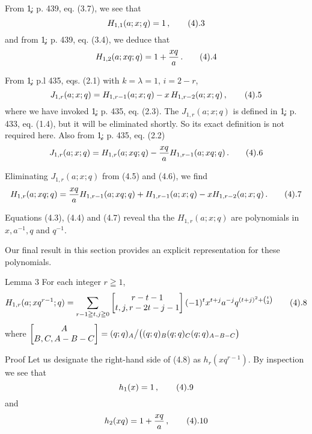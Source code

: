 From \c{1; p. 439, eq. (3.7)}, we see that
$$
	H_{1,1} (a; x; q) = 1\,,
\tag4.3
$$
and from \c{1; p. 439, eq. (3.4)}, we deduce that 
$$
	H_{1,2} (a; xq; q) = 1 + \fr{xq}{a}\,.
\tag4.4
$$

From \c{1; p.l 435, eqs. (2.1) with $k = \lambda = 1$, $i = 
2-r$},
$$
	J_{1,r} (a;x;q) = H_{1,r-1}(a;x;q) - x\,H_{1,r-2}
	(a;x;q)\,,
\tag4.5
$$
where we have invoked \c{1; p. 435, eq. (2.3)}.  The $J_{1,r}
(a;x;q)$ is defined in \c{1; p. 433, eq. (1.4)}, but it will be
eliminated shortly.  So its exact definition is not required here.
Also from \c{1; p. 435, eq. (2.2)}
$$
	J_{1,r}(a;x;q) = H_{1,r} (a;xq;q) - \fr{xq}{a}
	H_{1,r-1} (a;xq;q)\,.
\tag4.6
$$

Eliminating $J_{1,r}(a;x;q)$ from (4.5) and (4.6), we find
$$
	H_{1,r}(a;xq;q) = \fr{xq}{a} H_{1,r-1}(a;xq;q) + 
	H_{1,r-1}(a;x;q) - x H_{1,r-2} (a;x;q)\,.
\tag4.7
$$

Equations (4.3), (4.4) and (4.7) reveal tha the $H_{1,r}(a;x;q)$
are polynomials in $x,a^{-1},q$ and $q^{-1}$.

Our final result in this section provides an explicit representation
for these polynomials.

\proclaim
{Lemma 3}  For each integer $r \geqq 1$,
$$
	H_{1,r} (a;xq^{r-1};q) = \sum_{r-1\geqq t,j\geqq 0}
	\bmatrix r - t - 1 \\ t,j,r - 2t - j - 1 \endbmatrix
	(-1)^t x^{t+j} a^{-j} q^{(t+j)^2 + \binom{t}{2}} 
\tag4.8
$$
where $\bmatrix A \\ B,C,A - B -C \endbmatrix = (q;q)_A\big/
\big((q;q)_B(q;q)_C(q;q)_{A-B-C}\big)$
\endproclaim

\demo
{Proof}  Let us designate the right-hand side of (4.8) as 
$h_r(xq^{r-1})$.  By inspection we see that 
$$
	h_1(x) = 1\,,
\tag4.9
$$
and
$$
	h_2(xq) = 1 + \fr{xq}{a}\,,
\tag4.10
$$

